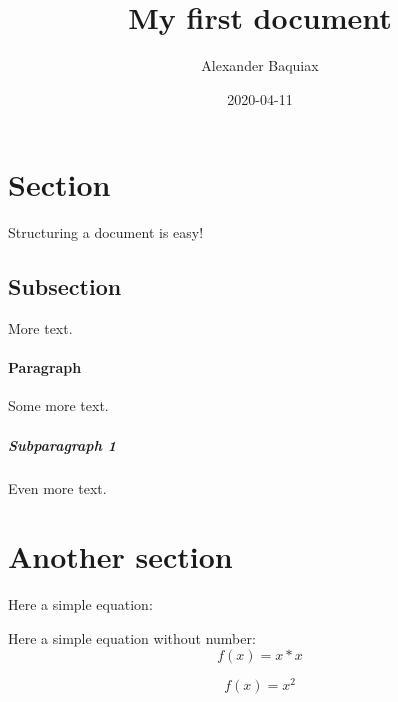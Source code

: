 \documentclass{article}
\title{My first document}
\date{2020-04-11}
\author{Alexander Baquiax}
\begin{document}
\maketitle
\newpage
{}

\section{Section}
Structuring a document is easy!

\subsection{Subsection}
More text.

\paragraph{Paragraph}
Some more text.

\subparagraph{Subparagraph 1}
Even more text.

\section{Another section}

Here a simple equation:

Here a simple equation without number:
\begin{equation*}
    f(x) = x*x
\end{equation*}

\begin{equation}
    f(x) = x^2
\end{equation}
\end{document}
